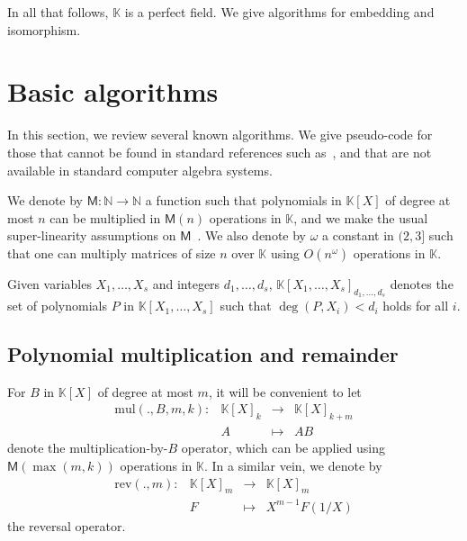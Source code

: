 \documentclass[12pt]{article}
\def\M {\ensuremath{\mathsf{M}}}
\def\N {\ensuremath{\mathbb{N}}}
\def\K {\ensuremath{\mathbb{K}}}
\def\mul {\ensuremath{\mathrm{mul}}}
\def\rev {\ensuremath{\mathrm{rev}}}
\begin{document}

In all that follows, $\K$ is a perfect field. We give algorithms 
for embedding and isomorphism.


\section{Basic algorithms}

In this section, we review several known algorithms. We give
pseudo-code for those that cannot be found in standard references such
as~\cite{vzGG}, and that are not available in standard computer
algebra systems.

We denote by $\M:\N \to \N$ a function such that polynomials in
$\K[X]$ of degree at most $n$ can be multiplied in $\M(n)$ operations
in $\K$, and we make the usual super-linearity assumptions on
$\M$~\cite[Chapter~8]{vzGG}. We also denote by $\omega$ a constant in
$(2,3]$ such that one can multiply matrices of size $n$ over $\K$
using $O(n^\omega)$ operations in $\K$.

Given variables $X_1,\dots,X_s$ and integers $d_1,\dots,d_s$,
$\K[X_1,\dots,X_s]_{d_1,\dots,d_s}$ denotes the set of polynomials $P$
in $\K[X_1,\dots,X_s]$ such that $\deg(P,X_i) < d_i$ holds for all
$i$.


\subsection{Polynomial multiplication and remainder}

For $B$ in $\K[X]$ of degree at most $m$, it will be convenient to let
$$
\begin{array}{cccc}
\mul(.,B,m,k): &\K[X]_k& \to &\K[X]_{k+m}\\
& A & \mapsto & AB
\end{array}$$ 
denote the multiplication-by-$B$ operator, which can be applied using
$\M(\max(m,k))$ operations in $\K$. In a similar vein, we denote by
$$
\begin{array}{cccc}
\rev(.,m): &\K[X]_m &\to& \K[X]_m  \\
& F & \mapsto & X^{m-1} F(1/X)
\end{array}$$ the reversal operator. 
\end{document}
